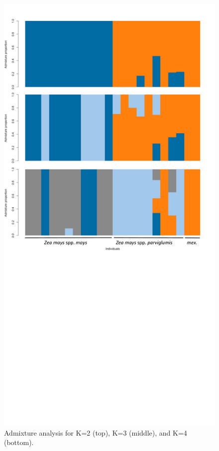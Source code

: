 \begin{figure}
\centering
\includegraphics[width=\linewidth]{figures/admixture.pdf}
\caption{Admixture analysis for K=2 (top), K=3 (middle), and K=4 (bottom).}
\label{fig:suppadmix}
\end{figure}

